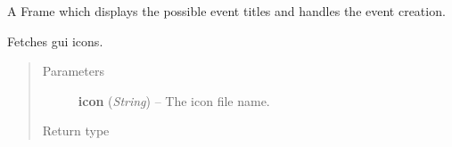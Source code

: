 \documentclass[letterpaper,10pt,english]{sphinxmanual}
\begin{document}
\begin{fulllineitems}
\label{wos:wos.EventList}
A Frame which displays the possible event titles and handles the event
creation.

\begin{fulllineitems}
\label{wos:wos.EventList.GetIcon}
Fetches gui icons.
\begin{quote}\begin{description}
\item[{Parameters}] \leavevmode
\textbf{icon} (\emph{String}) -- The icon file name.

\item[{Return type}] \leavevmode
{}

\end{description}\end{quote}

\end{fulllineitems}


\end{fulllineitems}

\end{document}
